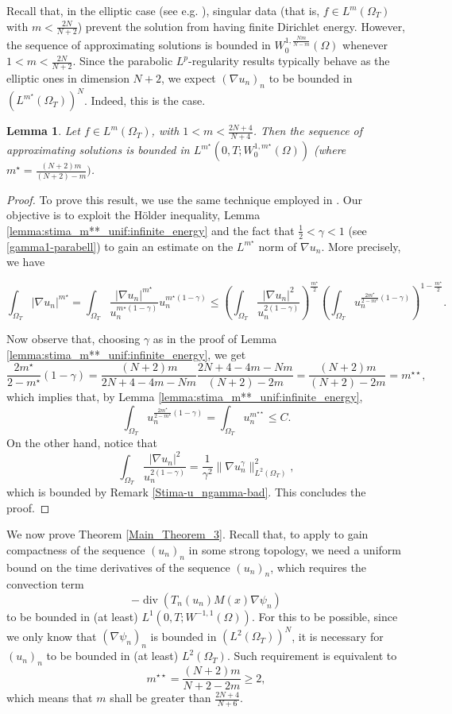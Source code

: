 \documentclass{amsart}
\numberwithin{equation}{section}
\newtheorem{lemma}[example]{Lemma}
\def\elle#1{L^{#1}}
\def\elleomT#1{L^{#1}(\Omega_T)}
\def\Sobom#1{W^{1,#1}_0(\Omega)}
\def\ioT{\int_{\Omega_T}}
\def\norma#1#2{ \|#1 \|_{#2}}
\newcommand{\abs}[1]{\left|#1\right|}
\begin{document}
Recall that, in the elliptic case (see e.g. \cite{BO-Kellersegel}), singular data (that is, $f\in\elleomT{m}$ with $m<\frac{2N}{N+2}$) prevent the solution from having finite Dirichlet energy. However, the sequence of approximating solutions is bounded in $\Sobom{\frac{Nm}{N-m}}$ whenever $1<m<\frac{2N}{N+2}$. 
Since the parabolic $L^p$-regularity results \cite{Aronson-Serrin,BDGO-parabolic} typically behave as the elliptic ones in dimension $N+2$,
we expect $(\nabla u_n)_n$ to be bounded in $\left(\elleomT{m^{\star}}\right)^N$. Indeed, this is the case.
\begin{lemma}\label{lemma:u_nW1m*_KS_parabell}
    Let $f\in\elleomT m$, with $1<m<\frac{2N+4}{N+4}$. Then the sequence of approximating solutions is bounded in $\elle {m^\star}(0,T;\Sobom{m^\star})$ (where ${m^\star}=\frac{(N+2)m}{(N+2)-m})$.
\end{lemma}
\begin{proof}
    To prove this result, we use the same technique employed in \cite{BoccardoJDE}. Our objective is to exploit the H\"older inequality, Lemma \ref{lemma:stima_m**_unif:infinite_energy} and the fact that $\frac12<\gamma<1$ (see \eqref{gamma1-parabell}) to gain an estimate on the $\elle {m^\star}$ norm of $\nabla u_n$.
    More precisely, we have

    $$\ioT \abs{\nabla u_n}^{m^\star} =
    \ioT \frac{\abs{\nabla u_n}^{m^\star}}{u_n^{{m^\star}(1-\gamma)}}u_n^{{m^\star}(1-\gamma)} 
    \leq
    \left(\ioT \frac{\abs{\nabla u_n}^2}{u_n^{2(1-\gamma)}}\right)^\frac{{m^\star}}{2}
    \left(\ioT u_n^{\frac{2{m^\star}}{2-{m^\star}}(1-\gamma)}\right)^{1-\frac{{m^\star}}{2}}.$$

    Now observe that, choosing $\gamma$ as in the proof of Lemma \ref{lemma:stima_m**_unif:infinite_energy}, we get
    $$\frac{2{m^\star}}{2-{m^\star}}(1-\gamma)=
    \frac{(N+2)m}{2N+4-4m-Nm}\frac{2N+4-4m-Nm}{(N+2)-2m}
    = \frac{(N+2)m}{(N+2)-2m}
    =m^{\star\star},$$
    which implies that, by Lemma \ref{lemma:stima_m**_unif:infinite_energy},
    $$\ioT u_n^{\frac{2{m^\star}}{2-{m^\star}}(1-\gamma)}=\ioT u_n^{m^{\star\star}}\leq C.$$
    On the other hand, notice that 
    $$\ioT \frac{\abs{\nabla u_n}^2}{u_n^{2(1-\gamma)}}=\frac{1}{\gamma^2}\norma{\nabla u_n^\gamma}{\elleomT2}^2,$$
    which is bounded by Remark \ref{Stima-u_ngamma-bad}. This concludes the proof.
\end{proof}

We now prove Theorem \ref{Main_Theorem_3}. Recall that, to apply \cite[Corollary 4]{Simon} to gain compactness of the sequence $(u_n)_n$ in some strong topology, we need a uniform bound on the time derivatives of the sequence $(u_n)_n$, which requires the convection term
$$-\operatorname{div}(T_n(u_n) M(x) \nabla \psi_n)$$ 
to be bounded in (at least) $\elle1(0,T;W^{-1,1}(\Omega))$. 
For this to be possible, since we only know that $(\nabla \psi_n)_n$ is bounded in $\left(\elleomT2\right)^N$, it is necessary for $(u_n)_n$ to be bounded in (at least) $\elleomT2$. Such requirement is equivalent to
$$m^{\star\star}=\frac{(N+2)m}{N+2-2m}\geq2,$$
which means that $m$ shall be greater than $\frac{2N+4}{N+6}$.
\end{document}
